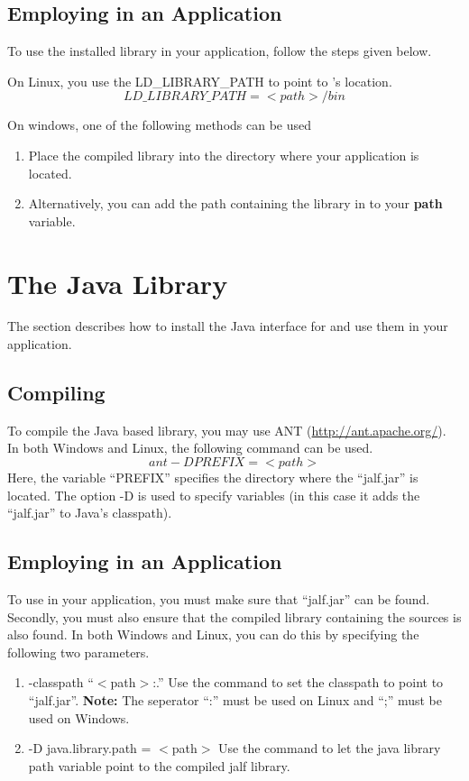 \subsection*{Employing \libalf in an Application}
To use the installed library in your application, follow the steps given below. \vskip 1pt

On Linux, you use the LD\_LIBRARY\_PATH to point to \libalf's location.
\[
  LD\_LIBRARY\_PATH = <path>/bin
\]

On windows, one of the following methods can be used 
\begin{enumerate}
 \item Place the compiled library into the directory where your application is located.
 \item Alternatively, you can add the path containing the \libalf library in to your \textbf{path} variable.
\end{enumerate}

\section{The \jalf Java Library}
The section describes how to install the Java interface for \libalf and use them in your application.
\subsection*{Compiling \libalf}
To compile the Java based \libalf library, you may use ANT (\url{http://ant.apache.org/}). \vskip 1pt
In both Windows and Linux, the following command can be used.
\[
  ant -D PREFIX=<path>
\]
Here, the variable ``PREFIX'' specifies the directory where the ``jalf.jar'' is located. The option -D is used to specify variables (in this case it adds the ``jalf.jar'' to Java's classpath). \vskip 1pt

\subsection*{Employing \jalf in an Application}
To use \libalf in your application, you must make sure that ``jalf.jar'' can be found. Secondly, you must also ensure that the compiled \jalf library containing the \libalf sources is also found.  \vskip 1pt
In both Windows and Linux, you can do this by specifying the following two parameters.
\begin{enumerate}
 \item -classpath ``$<$path$>$:.'' \vskip 1pt
	Use the command to set the classpath to point to ``jalf.jar''. \vskip 1pt
	\textbf{Note:} The seperator ``:'' must be used on Linux and ``;'' must be used on Windows.
 \item -D java.library.path = $<$path$>$ \vskip 1pt
	Use the command to let the java library path variable point to the compiled jalf library. 
\end{enumerate}

